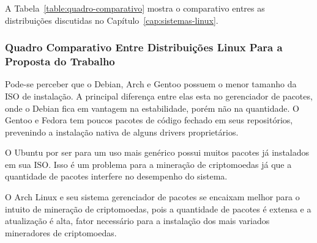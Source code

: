 \documentclass[
article,			%
12pt,				%
openright,			%
oneside,			%
a4paper,			%
chapter=TITLE,		%
section=TITLE,		%
subsection=TITLE,	%
subsubsection=TITLE,%
subsubsubsection=TITLE, %
english,			%
brazil,				%
]{abntex2}
\begin{document}
A Tabela~\ref{table:quadro-comparativo} mostra o comparativo entres as
distribuições discutidas no Capítulo~\ref{cap:sistemas-linux}.

\subsubsection{Quadro Comparativo Entre Distribuições Linux Para a
Proposta do Trabalho}

\begin{table}[H]
    \centering
    \caption{\label{table:quadro-comparativo}Quadro Comparativo Entre
    Distribuições Linux}
\end{table}

Pode-se perceber que o Debian, Arch e Gentoo possuem o menor tamanho
da ISO de instalação. A principal diferença entre elas esta no
gerenciador de pacotes, onde o Debian fica em vantagem na
estabilidade, porém não na quantidade. O Gentoo e Fedora tem poucos
pacotes de código fechado em seus repositórios, prevenindo a
instalação nativa de alguns drivers proprietários.

O Ubuntu por ser para um uso mais genérico possui muitos pacotes já
instalados em sua ISO\@. Isso é um problema para a mineração de
criptomoedas já que a quantidade de pacotes interfere no desempenho do
sistema. 

O Arch Linux e seu sistema gerenciador de pacotes se encaixam melhor
para o intuito de mineração de criptomoedas, pois a quantidade de
pacotes é extensa e a atualização é alta, fator necessário para a
instalação dos mais variados mineradores de criptomoedas.

\pagebreak 
\end{document}
